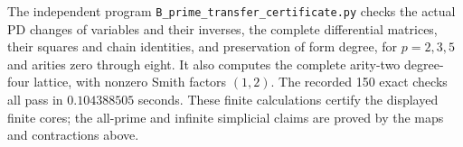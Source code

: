 The independent program
\texttt{B\_prime\_transfer\_certificate.py} checks the
actual PD changes of variables and their inverses,
the complete differential matrices, their squares
and chain identities, and preservation of form degree,
for $p=2,3,5$ and arities zero through eight.
It also computes the complete arity-two degree-four
lattice, with nonzero Smith factors $(1,2)$.
The recorded 150 exact checks all pass in
$0.104388505$ seconds.
These finite calculations certify the displayed
finite cores; the all-prime and infinite simplicial
claims are proved by the maps and contractions above.

